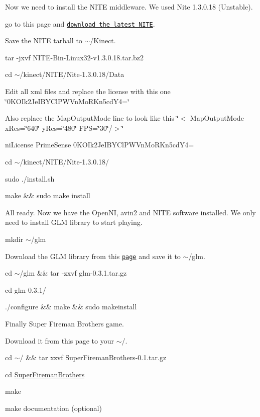 Now we need to install the NITE middleware. We used Nite 1.3.0.18 (Unstable).


\begin{DoxyEnumerate}
\item go to this page and \href{http://www.openni.org/downloadfiles/openni-compliant-middleware-binaries/33-latest-unstable}{\tt download the latest NITE}.
\item Save the NITE tarball to $\sim$/Kinect.
\item tar -\/jxvf NITE-\/Bin-\/Linux32-\/v1.3.0.18.tar.bz2
\item cd $\sim$/kinect/NITE/Nite-\/1.3.0.18/Data
\item Edit all xml files and replace the license with this one \char`\"{}0KOIk2JeIBYClPWVnMoRKn5cdY4=\char`\"{}
\item Also replace the MapOutputMode line to look like this \char`\"{}$<$
  MapOutputMode xRes=\char`\"{}640\char`\"{} yRes=\char`\"{}480\char`\"{} FPS=\char`\"{}30\char`\"{}/$>$\char`\"{}
\item niLicense PrimeSense 0KOIk2JeIBYClPWVnMoRKn5cdY4=
\item cd $\sim$/kinect/NITE/Nite-\/1.3.0.18/
\item sudo ./install.sh
\item make \&\& sudo make install
\end{DoxyEnumerate}

All ready. Now we have the OpenNI, avin2 and NITE software installed. We only need to install GLM library to start playing.


\begin{DoxyEnumerate}
\item mkdir $\sim$/glm
\item Download the GLM library from this \href{http://devernay.free.fr/hacks/glm/}{\tt page} and save it to $\sim$/glm.
\item cd $\sim$/glm \&\& tar -\/zxvf glm-\/0.3.1.tar.gz
\item cd glm-\/0.3.1/
\item ./configure \&\& make \&\& sudo makeinstall
\end{DoxyEnumerate}

Finally Super Fireman Brothers game.


\begin{DoxyEnumerate}
\item Download it from this page to your $\sim$/.
\item cd $\sim$/ \&\& tar xzvf SuperFiremanBrothers-\/0.1.tar.gz
\item cd \hyperlink{classSuperFiremanBrothers}{SuperFiremanBrothers}
\item make
\item make documentation (optional)
\end{DoxyEnumerate}

